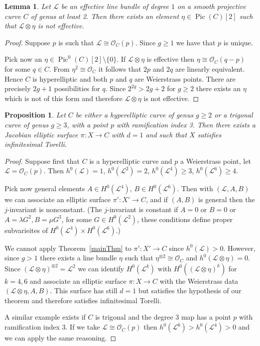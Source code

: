 \documentclass{amsart}
\newcommand{\cL}{\mathcal{L}}
\newcommand{\cO}{\mathcal{O}}
\newtheorem{lemma}[theorem]{Lemma}
\newtheorem{proposition}[theorem]{Proposition}
\theoremstyle{definition}
\theoremstyle{remark}
\DeclareMathOperator{\Pic}{Pic}
\begin{document}
\begin{lemma}\label{lemTwist} Let $\cL$ be an effective line bundle of degree $1$ on a smooth projective curve $C$ of genus at least 2. Then there exists an element $\eta \in \Pic(C)[2]$ such that $\cL\otimes \eta$ is not effective.
\end{lemma}

\begin{proof} Suppose $p$ is such that $\cL\cong\cO_C(p)$. Since $g\geq 1$ we have that $p$ is unique. 

Pick now an $\eta\in \Pic^0(C)[2]\setminus \{0\}$. If $\cL\otimes \eta$ is effective then $\eta\cong \cO_C(q-p)$ for some $q\in C$. From $\eta^2\cong \cO_C$ it follows that $2p$ and $2q$ are linearly equivalent. Hence $C$ is hyperelliptic and both $p$ and $q$ are Weierstrass points. There are precisely $2g+1$ possibilities for $q$. Since $2^{2g}>2g+2$ for $g \geq 2$ there exists an $\eta$ which is not of this form and therefore $\cL\otimes \eta$ is not effective.
\end{proof}


\begin{proposition} Let $C$ be either a hyperelliptic curve of genus $g\geq 2$ or a trigonal curve of genus $g\geq 3$, with a point $p$ with ramification index 3. Then there exists a Jacobian elliptic surface $\pi:X\to C$ with $d=1$ and such that $X$ satisfies infinitesimal Torelli.
\end{proposition}

\begin{proof}
Suppose first that $C$  is a hyperelliptic curve and $p$ a Weierstrass point, let $\cL=\cO_C(p)$. Then $h^0(\cL)=1$, $h^0(\cL^2)=2$, $h^0(\cL^4)\geq 3$, $h^0(\cL^6)\geq 4$.

Pick now general elements $A\in H^0(\cL^4)$, $B\in H^0(\cL^6)$. Then with $(\cL, A,B)$ we can associate an elliptic surface $\pi': X'\to C$, and if $(A,B)$ is general then the $j$-invariant is nonconstant. (The $j$-invariant is constant if $A=0$ or $B=0$ or $A=\lambda G^2, B=\mu G^3$, for some $G\in H^0(\cL^2)$, these conditions define proper subvarieites of $H^0(\cL^4)\times H^0(\cL^6)$.)

We cannot apply Theorem~\ref{mainThm} to $\pi':X'\to C$  since $h^0(\cL)>0$. However, since $g>1$  there exists a line bundle $\eta$ such that $\eta^{\otimes 2}\cong\cO_C$ and $h^0(\cL\otimes \eta)=0$. Since $(\cL\otimes \eta)^{\otimes 2}=\cL^2$ we can identify $H^0(\cL^k)$ with $H^0((\cL\otimes\eta)^k)$ for $k=4,6$ and associate an elliptic surface $\pi:X\to C$ with the Weierstrass data $(\cL\otimes \eta, A,B)$. This surface has still $d=1$ but satisfies the hypothesis of our theorem and therefore satisfies infinitesimal Torelli.

A similar example exists if $C$ is trigonal and the degree 3 map has a point $p$ with ramification index $3$. If we take $\cL\cong \cO_C(p)$ then $h^0(\cL^6)>h^0(\cL^4)>0$ and we can apply the same reasoning.
\end{proof}
\end{document}
